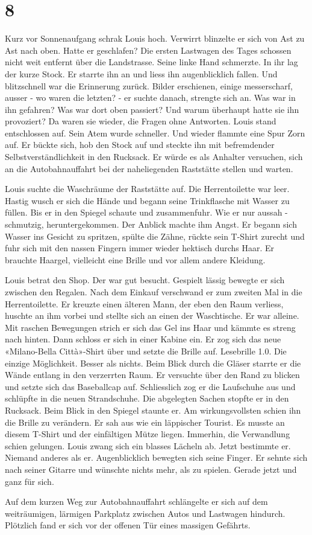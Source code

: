 \chapter{8}



Kurz vor Sonnenaufgang schrak Louis hoch. 
Verwirrt blinzelte er sich von Ast zu Ast nach oben. Hatte er geschlafen? Die ersten
Lastwagen des Tages schossen nicht weit entfernt über die Landstrasse. Seine linke Hand schmerzte. In ihr lag der kurze Stock. Er starrte ihn an und liess ihn augenblicklich fallen. 
Und blitzschnell war die Erinnerung zurück. Bilder erschienen, einige
messerscharf, ausser - wo waren die letzten? - er suchte danach, strengte sich an. Was war in
ihn gefahren? Was war dort oben passiert? Und warum überhaupt hatte sie ihn provoziert?
Da waren sie wieder, die Fragen ohne Antworten. 
Louis stand entschlossen auf. 
Sein Atem wurde schneller. Und wieder flammte eine Spur Zorn auf.
Er bückte sich, hob den Stock auf und steckte ihn mit befremdender Selbstverständlichkeit in den Rucksack.
Er würde es als Anhalter versuchen, sich an die Autobahnauffahrt bei der
naheliegenden Raststätte stellen und warten. 

\sectionbreak

Louis suchte die Waschräume der Raststätte auf. Die Herrentoilette war
leer.
Hastig wusch er sich die Hände und begann seine Trinkflasche
mit Wasser zu füllen. Bis er in den Spiegel schaute und zusammenfuhr.
Wie er nur aussah -  schmutzig, heruntergekommen. Der Anblick machte ihm
Angst.
Er begann sich Wasser ins Gesicht zu spritzen, spülte die Zähne, rückte
sein T-Shirt zurecht und fuhr sich mit den nassen Fingern immer wieder
hektisch durchs Haar. Er brauchte Haargel, vielleicht eine Brille und vor allem 
andere Kleidung.

Louis betrat den Shop. Der war gut besucht. Gespielt lässig bewegte er sich
zwischen den Regalen. Nach dem Einkauf verschwand er zum zweiten Mal in die Herrentoilette. 
Er kreuzte einen älteren Mann, der eben den Raum verliess,
huschte an ihm vorbei und stellte sich an einen der Waschtische. Er war
alleine. Mit raschen Bewegungen strich er sich das Gel ins Haar und
kämmte es streng nach hinten. Dann schloss er sich in einer Kabine ein.
Er zog sich das neue «Milano-Bella Città»-Shirt über und setzte die
Brille auf. Lesebrille 1.0. Die einzige Möglichkeit. Besser als nichts.
Beim Blick durch die Gläser starrte er die Wände entlang in den
verzerrten Raum. Er versuchte über den Rand zu blicken und setzte sich
das Baseballcap auf. Schliesslich zog er die Laufschuhe aus und schlüpfte in die neuen
Strandschuhe. Die abgelegten Sachen stopfte er in den Rucksack. Beim
Blick in den Spiegel staunte er. Am wirkungsvollsten schien ihn die Brille zu
verändern. Er sah aus wie ein läppischer Tourist. Es musste an 
diesem T-Shirt und der einfältigen Mütze liegen. Immerhin, die Verwandlung schien
gelungen. Louis zwang sich ein blasses Lächeln ab. Jetzt bestimmte er. Niemand
anderes als er. Augenblicklich bewegten sich seine Finger. Er sehnte sich nach seiner Gitarre und wünschte nichts mehr, 
als zu spielen. Gerade jetzt und ganz für sich.

\sectionbreak

Auf dem kurzen Weg zur Autobahnauffahrt schlängelte er sich auf dem
weiträumigen, lärmigen Parkplatz zwischen Autos und Lastwagen hindurch.
Plötzlich fand er sich vor der offenen Tür eines massigen Gefährts.
